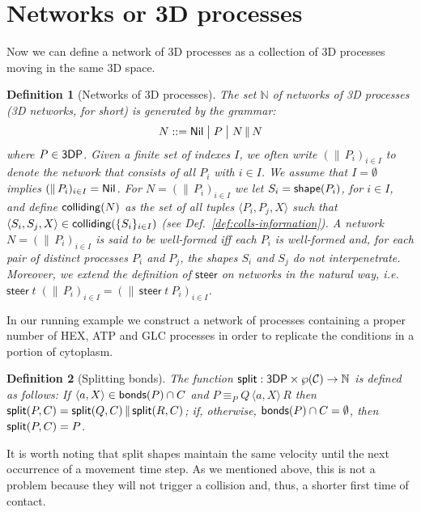 \documentclass[11pt]{article}
\newcommand{\bonds}{{\sf bonds}}
\newcommand{\Split}{{\sf split}}
\newcommand{\gor}{\;\big|\;}
\newcommand{\proc}{\sf{3DP}}
\newcommand{\channels}{{\cal C}}
\newcommand{\colliding}{{\sf colliding}}
\newcommand{\NIL}{{\sf Nil}}
\newcommand{\move}{\ensuremath{\mathsf{steer}}}
\newcommand{\unionc}[1]{\,\langle #1 \rangle\,}
\newcommand{\nets}{{\mathbb N}}
\newcommand{\shape}{{\sf shape}}
\newtheorem{definition}{Definition}
\begin{document}
\section{Networks or 3D processes}\label{sec:networks}

Now we can define a network of 3D processes as a collection of 3D processes moving in
the same 3D space.

\begin{definition}[Networks of 3D processes]
\label{def:networks}
The set $\nets$ of {\em networks of 3D processes} (3D networks, for short) is generated by the
grammar:
$$N ::= \NIL \gor P \gor N\,\|\, N $$
where $ P \in \proc$. Given a finite set of indexes $I$, we often write $ (\| \, P_i)_{i \in I}$
to denote the network that consists of all $P_i$ with $i \in I$. We assume that $I = \emptyset$
implies $(\|\, P_i)_{i \in I} = \NIL$. For $N  =(\| \, P_i)_{i \in I}$ we let $S_i = \shape(P_i)$,
for $i \in I$, and define $\colliding(N)$ as the set of all tuples $\langle P_i, P_j, X \rangle$  such that $\langle S_i, S_j, X \rangle \in \colliding(\{S_i\}_{i \in I})$ (see Def.~\ref{def:colls-information}).
A network $N = (\| \, P_i)_{i \in I}$ is said to be well-formed iff each $P_i$ is well-formed and,
for each pair of distinct processes $P_i$ and $P_j$, the shapes $S_i$ and $S_j$ {\em do not
interpenetrate}. Moreover, we extend the definition of $\move$ on networks in the natural way,
i.e.\ $\move \; t \;  (\| \, P_i)_{i \in I} = (\| \, \move \; t \ P_i)_{i \in I}$.
\end{definition}

In our running example we construct a network of processes containing a proper number of HEX, ATP
and GLC processes in order to replicate the conditions in a portion of cytoplasm.

\begin{definition}[Splitting bonds]\label{def:split}
The function $\Split: \proc  \times \wp(\channels) \rightarrow \nets$ is defined as follows:
If $\langle a, X \rangle \in \bonds(P) \cap C$ and $P \equiv_P Q \unionc{a, X} R$ then $\Split(P,
C) = \Split(Q, C) \,\|\, \Split(R, C)$; if, otherwise, $\bonds(P)  \cap C = \emptyset$, then
$\Split(P, C) = P$.
\end{definition}

It is worth noting that split shapes maintain the same velocity until the next occurrence of a
movement time step. As we mentioned above, this is not a problem because they will not trigger a
collision and, thus, a shorter first time of contact.
\end{document}
